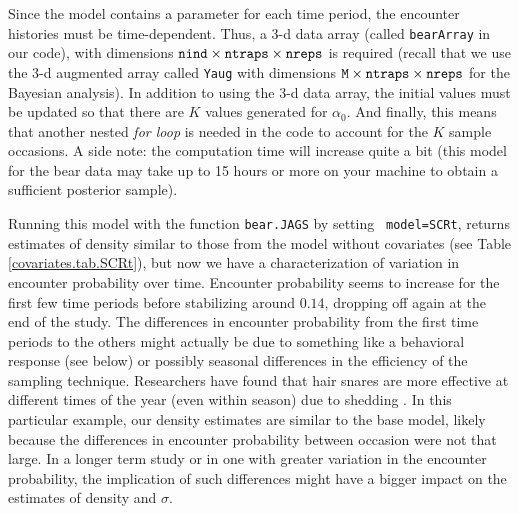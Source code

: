 Since the model contains a parameter for each time period, the
encounter histories must be time-dependent.  Thus, a 3-d data array
(called \mbox{\tt bearArray} in our code), with dimensions $\mbox{\tt
  nind} \times \mbox{\tt ntraps} \times \mbox{\tt nreps}$ is
required (recall that we use the 3-d augmented array called {\tt Yaug}
with dimensions $\mbox{\tt M} \times \mbox{\tt ntraps} \times \mbox{\tt nreps}$
for the Bayesian analysis). In addition to using the 3-d data array, the initial values
must be updated so that there are $K$ values generated for $\alpha_0$.
And finally, this means that another nested {\it for loop} is needed
in the code to account for the $K$ sample occasions.  A side note: the
computation time will increase quite a bit (this model for the bear
data may take up to 15 hours or more on your machine to obtain a
sufficient posterior sample).

Running this model with the function {\tt bear.JAGS} by setting {\tt
  model=SCRt}, returns estimates of density similar to those from the model 
  without covariates (see Table \ref{covariates.tab.SCRt}), but
now we have a characterization of variation in encounter probability
over time.  Encounter probability seems to increase for the first few
time periods before stabilizing around $0.14$, dropping off again at
the end of the study.  The differences in encounter probability from
the first time periods to the others might actually be due to
something like a behavioral response (see below) or possibly seasonal
differences in the efficiency of the sampling technique.  Researchers
have found that hair snares are more effective at different times of
the year (even within season) due to shedding
\citep{wegan_etal:2012}.  In this particular example, our density
estimates are similar to the base model, likely because the
differences in encounter probability
 between occasion were not that large.  In a
longer term study or in one with greater variation in the encounter
probability, the implication of such differences might have a bigger
impact on the estimates of density and $\sigma$.

